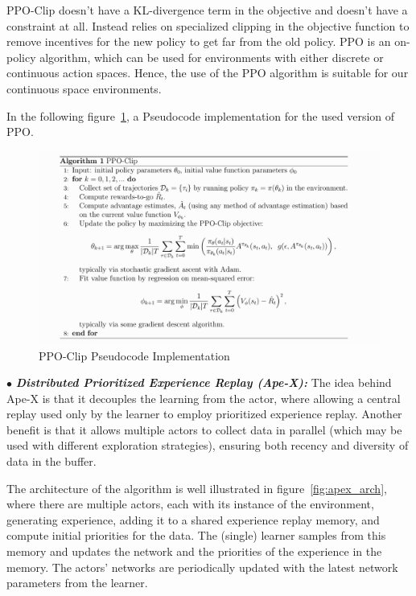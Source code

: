 PPO-Clip doesn’t have a KL-divergence term in the objective and doesn’t have a constraint at all. Instead relies on specialized clipping in the objective function to remove incentives for the new policy to get far from the old policy. PPO is an on-policy algorithm, which can be used for environments with either discrete or continuous action spaces. Hence, the use of the PPO algorithm is suitable for our continuous space environments.

In the following figure~\ref{fig:ppo_algorithm}, a Pseudocode implementation for the used version of PPO.
\begin{figure}[!htb]
		\centering
		\includegraphics[width=\linewidth]{figures/ppo.png}
		\caption{PPO-Clip Pseudocode Implementation}
		\label{fig:ppo_algorithm}
\end{figure}


$\bullet$ \textit{\textbf{Distributed Prioritized Experience Replay (Ape-X):}} The idea behind Ape-X is that it decouples the learning from the actor, where allowing a central replay used only by the learner to employ prioritized experience replay. Another benefit is that it allows multiple actors to collect data in parallel (which may be used with different exploration strategies), ensuring both recency and diversity of data in the buffer. 

The architecture of the algorithm is well illustrated in figure~\ref{fig:apex_arch}, where there are multiple actors, each with its instance of the environment, generating experience, adding it to a shared experience replay memory, and compute initial priorities for the data. The (single) learner samples from this memory and updates the network and the priorities of the experience in the memory. The actors’ networks are periodically updated with the latest network parameters from the learner.

